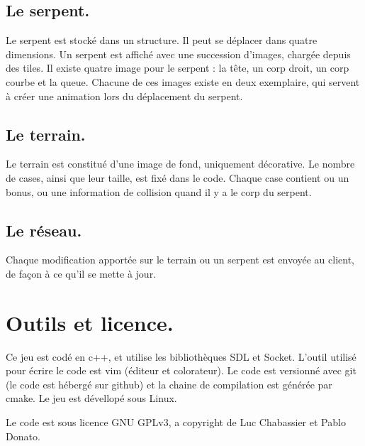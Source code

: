 \documentclass{article}
\begin{document}
\subsection{Le serpent.}
Le serpent est stocké dans un structure. Il peut se déplacer dans quatre dimensions. Un serpent est affiché avec une succession d'images, chargée depuis des tiles. Il existe quatre image pour le serpent : la tête, un corp droit, un corp courbe et la queue. Chacune de ces images existe en deux exemplaire, qui servent à créer une animation lors du déplacement du serpent.

\subsection{Le terrain.}
Le terrain est constitué d'une image de fond, uniquement décorative. Le nombre de cases, ainsi que leur taille, est fixé dans le code. Chaque case contient ou un bonus, ou une information de collision quand il y a le corp du serpent.

\subsection{Le réseau.}
Chaque modification apportée sur le terrain ou un serpent est envoyée au client, de façon à ce qu'il se mette à jour.

\section{Outils et licence.}
Ce jeu est codé en c++, et utilise les bibliothèques SDL et Socket. L'outil utilisé pour écrire le code est vim (éditeur et colorateur). Le code est versionné avec git (le code est hébergé sur github) et la chaine de compilation est générée par cmake. Le jeu est dévellopé sous Linux.

Le code est sous licence GNU GPLv3, a copyright de Luc Chabassier et Pablo Donato.
\end{document}
